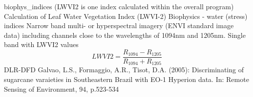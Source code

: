 %
{ %
biophys\_indices (LWVI2 is one index calculated within the overall program)
}
%
{ %
Calculation of Leaf Water Vegetation Index (LWVI-2)
}
%
{ %
Biophysics - water (stress) indices
}
%
{ %
Narrow band multi- or hyperspectral imagery (ENVI standard image data) including channels close to the wavelengths of 1094nm and 1205nm.\bigskip
}
%
{ %
Single band with LWVI2 values
}
%
{ %
\begin{displaymath}
LWVI2 = \frac{R_{1094}-R_{1205}}{R_{1094}+R_{1205}}
\end{displaymath}
}
%
{ %
DLR-DFD
}
%
{ %
Galvao, L.S., Formaggio, A.R., Tisot, D.A. (2005): Discriminating of sugarcane varaieties in Southeastern Brazil with EO-1 Hyperion data. In: Remote Sensing of Environment, 94, p.523-534
}
